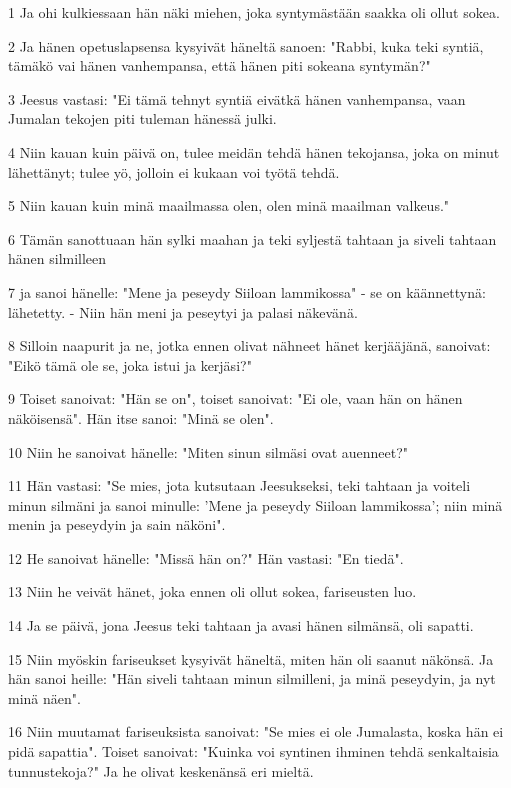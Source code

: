 \par 1 Ja ohi kulkiessaan hän näki miehen, joka syntymästään saakka oli ollut sokea.
\par 2 Ja hänen opetuslapsensa kysyivät häneltä sanoen: "Rabbi, kuka teki syntiä, tämäkö vai hänen vanhempansa, että hänen piti sokeana syntymän?"
\par 3 Jeesus vastasi: "Ei tämä tehnyt syntiä eivätkä hänen vanhempansa, vaan Jumalan tekojen piti tuleman hänessä julki.
\par 4 Niin kauan kuin päivä on, tulee meidän tehdä hänen tekojansa, joka on minut lähettänyt; tulee yö, jolloin ei kukaan voi työtä tehdä.
\par 5 Niin kauan kuin minä maailmassa olen, olen minä maailman valkeus."
\par 6 Tämän sanottuaan hän sylki maahan ja teki syljestä tahtaan ja siveli tahtaan hänen silmilleen
\par 7 ja sanoi hänelle: "Mene ja peseydy Siiloan lammikossa" - se on käännettynä: lähetetty. - Niin hän meni ja peseytyi ja palasi näkevänä.
\par 8 Silloin naapurit ja ne, jotka ennen olivat nähneet hänet kerjääjänä, sanoivat: "Eikö tämä ole se, joka istui ja kerjäsi?"
\par 9 Toiset sanoivat: "Hän se on", toiset sanoivat: "Ei ole, vaan hän on hänen näköisensä". Hän itse sanoi: "Minä se olen".
\par 10 Niin he sanoivat hänelle: "Miten sinun silmäsi ovat auenneet?"
\par 11 Hän vastasi: "Se mies, jota kutsutaan Jeesukseksi, teki tahtaan ja voiteli minun silmäni ja sanoi minulle: 'Mene ja peseydy Siiloan lammikossa'; niin minä menin ja peseydyin ja sain näköni".
\par 12 He sanoivat hänelle: "Missä hän on?" Hän vastasi: "En tiedä".
\par 13 Niin he veivät hänet, joka ennen oli ollut sokea, fariseusten luo.
\par 14 Ja se päivä, jona Jeesus teki tahtaan ja avasi hänen silmänsä, oli sapatti.
\par 15 Niin myöskin fariseukset kysyivät häneltä, miten hän oli saanut näkönsä. Ja hän sanoi heille: "Hän siveli tahtaan minun silmilleni, ja minä peseydyin, ja nyt minä näen".
\par 16 Niin muutamat fariseuksista sanoivat: "Se mies ei ole Jumalasta, koska hän ei pidä sapattia". Toiset sanoivat: "Kuinka voi syntinen ihminen tehdä senkaltaisia tunnustekoja?" Ja he olivat keskenänsä eri mieltä.
